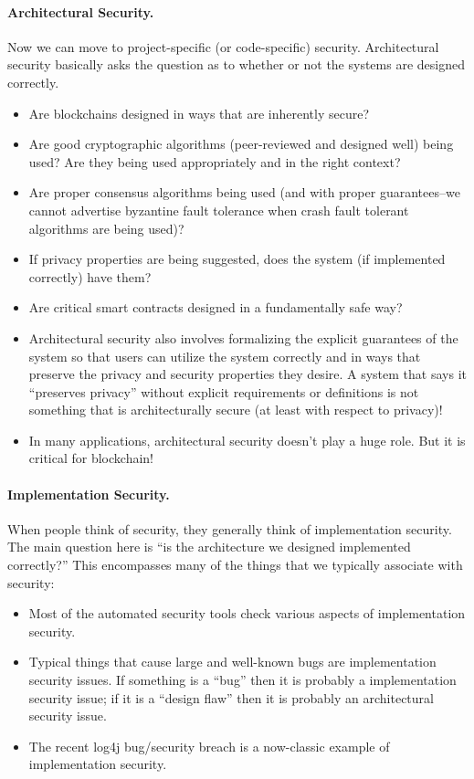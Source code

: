 \paragraph{Architectural Security.}  Now we can move to project-specific (or code-specific) security.  Architectural security basically asks the question as to whether or not the systems are designed correctly.
\begin{itemize}
\item Are blockchains designed in ways that are inherently secure?
\item Are good cryptographic algorithms (peer-reviewed and designed well) being used?  Are they being used appropriately and in the right context?
\item Are proper consensus algorithms being used (and with proper guarantees--we cannot advertise byzantine fault tolerance when crash fault tolerant algorithms are being used)?
\item If privacy properties are being suggested, does the system (if implemented correctly) have them?
\item Are critical smart contracts designed in a fundamentally safe way?
\item Architectural security also involves formalizing the explicit guarantees of the system so that users can utilize the system correctly and in ways that preserve the privacy and security properties they desire.  A system that says it ``preserves privacy'' without explicit requirements or definitions is not something that is architecturally secure (at least with respect to privacy)!
\item In many applications, architectural security doesn't play a huge role.  But it is critical for blockchain!
\end{itemize}

\paragraph{Implementation Security.}  When people think of security, they generally think of implementation security.  The main question here is ``is the architecture we designed implemented correctly?''  This encompasses many of the things that we typically associate with security:
\begin{itemize}
\item Most of the automated security tools check various aspects of implementation security.
\item Typical things that cause large and well-known bugs are implementation security issues.  If something is a ``bug'' then it is probably a implementation security issue; if it is a ``design flaw'' then it is probably an architectural security issue.
\item The recent log4j bug/security breach is a now-classic example of implementation security.
\end{itemize}

